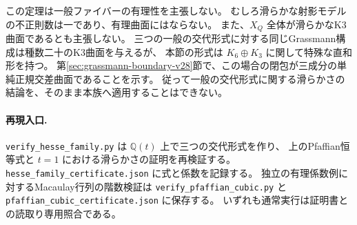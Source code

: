 \begin{remark}[得られた結論の範囲]
この定理は一般ファイバーの有理性を主張しない。
むしろ滑らかな射影モデルの不正則数は一であり、有理曲面にはならない。
また、$X_Q$ 全体が滑らかなK3曲面であるとも主張しない。
三つの一般の交代形式に対する同じGrassmann構成は種数二十のK3曲面を与えるが\cite{MukaiGenus20}、
本節の形式は $K_6\oplus K_3$ に関して特殊な直和形を持つ。
第\ref{sec:grassmann-boundary-v28}節で、この場合の閉包が三成分の単純正規交差曲面であることを示す。
従って一般の交代形式に関する滑らかさの結論を、そのまま本族へ適用することはできない。
\end{remark}

\paragraph{再現入口.}
\nolinkurl{verify_hesse_family.py} は $\mathbb Q(t)$ 上で三つの交代形式を作り、
上のPfaffian恒等式と $t=1$ における滑らかさの証明を再検証する。
\nolinkurl{hesse_family_certificate.json} に式と係数を記録する。
独立の有理係数例に対するMacaulay行列の階数検証は
\nolinkurl{verify_pfaffian_cubic.py} と \nolinkurl{pfaffian_cubic_certificate.json} に保存する。
いずれも通常実行は証明書との読取り専用照合である。
